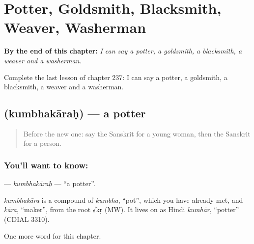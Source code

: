 
\chapter{Potter, Goldsmith, Blacksmith, Weaver, Washerman}
\label{ch:sa-potter-goldsmith-blacksmith-weaver-washerman}

\begin{chapteropening}
\textbf{By the end of this chapter:} \emph{I can say a potter, a goldsmith, a blacksmith, a weaver and a washerman.}

Complete the last lesson of chapter 237: I can say a potter, a goldsmith, a blacksmith, a weaver and a washerman.
\end{chapteropening}

\section[\texorpdfstring{\sk{कुम्भकारः} (kumbhakāraḥ)}{कुम्भकारः (kumbhakāraḥ)}]{ (kumbhakāraḥ) — a potter}

\label{lesson:SA-C237-kumbhakarah}



\begin{quote}
Before the new one: say the Sanskrit for a young woman, then the Sanskrit for a person.
\end{quote}

\subsection*{You'll want to know: }
\textbf{} — \emph{kumbhakāraḥ} — \textquotedblleft{}a potter\textquotedblright{}.

\begin{cousinweb}
\emph{kumbhakāra} is a compound of \emph{kumbha}, \textquotedblleft{}pot\textquotedblright{}, which you have already met, and \emph{kāra}, \textquotedblleft{}maker\textquotedblright{}, from the root √kṛ (MW). It lives on as Hindi \emph{kumhār}, \textquotedblleft{}potter\textquotedblright{} (CDIAL 3310).
\end{cousinweb}

\begin{grammarlens}[title={What you've built}]
One more word for this chapter.
\end{grammarlens}

